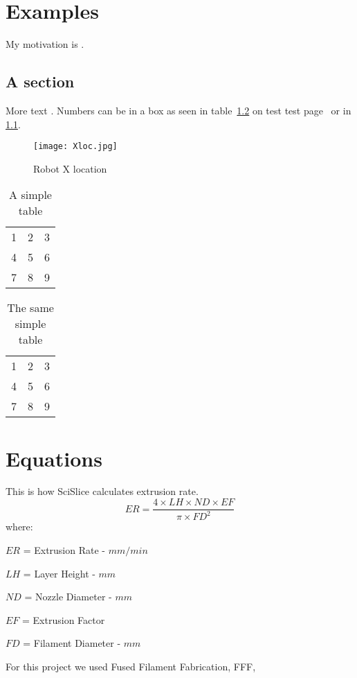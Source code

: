 \documentclass[main.tex]{subfiles}
\begin{document}
\chapter{Examples}
My motivation is \cite{einstein}.
\section{A section}
More text \cite{knuthwebsite}. Numbers can be in a box \cite{Singamneni2012} as seen in table~\ref{tab:box2} on test test page~\pageref{tab:box2} or in \ref{fig:xloc}.
\begin{figure}[h]
	\centering
	\texttt{[image: Xloc.jpg]}
	\caption{Robot X location}
	\label{fig:xloc}
\end{figure}

\begin{table}
  \centering
    \begin{tabular}{| l c r |}
    \hline
    1 & 2 & 3 \\
    4 & 5 & 6 \\
    7 & 8 & 9 \\
    \hline
    \end{tabular}
  \caption{A simple table}
  \label{tab:box1}
\end{table}

\begin{table}
  \centering
    \begin{tabular}{| l c r |}
    \hline
    1 & 2 & 3 \\
    4 & 5 & 6 \\
    7 & 8 & 9 \\
    \hline
    \end{tabular}
  \caption{The same simple table}
  \label{tab:box2}
\end{table}

\lipsum[1-6]

\chapter{Equations}
This is how SciSlice calculates extrusion rate.
$$
ER = \frac{4 \times LH \times ND \times EF}{\pi \times FD^2}
$$
where:

$ER$ = Extrusion Rate - $mm/min$

$LH$ = Layer Height - $mm$

$ND$ = Nozzle Diameter - $mm$

$EF$ = Extrusion Factor

$FD$ = Filament Diameter - $mm$
 
For this project we used Fused Filament Fabrication, FFF,
\end{document}

